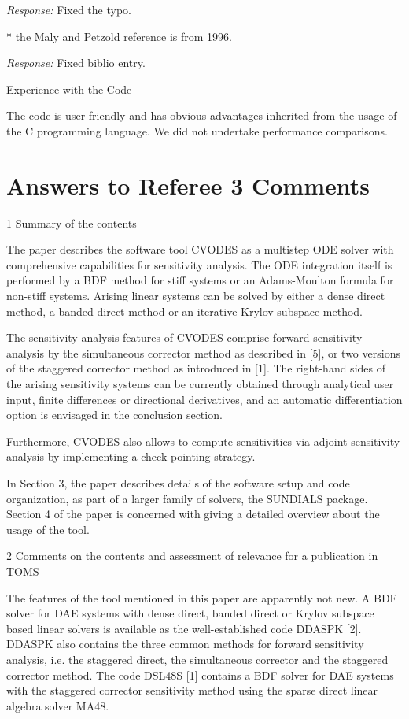 {\em Response:}
Fixed the typo.

* the Maly and Petzold reference is from 1996.

{\em Response:} Fixed biblio entry.

Experience with the Code

The code is user friendly and has obvious advantages inherited from
the usage of the C programming language. We did not undertake
performance comparisons.


\newpage
\section{Answers to Referee 3 Comments}

1 Summary of the contents

The paper describes the software tool CVODES as a multistep ODE solver
with comprehensive capabilities for sensitivity analysis. The ODE
integration itself is performed by a BDF method for stiff systems or
an Adams-Moulton formula for non-stiff systems. Arising linear systems
can be solved by either a dense direct method, a banded direct method
or an iterative Krylov subspace method.

The sensitivity analysis features of CVODES comprise forward
sensitivity analysis by the simultaneous corrector method as described
in [5], or two versions of the staggered corrector method as
introduced in [1]. The right-hand sides of the arising sensitivity
systems can be currently obtained through analytical user input,
finite differences or directional derivatives, and an automatic
differentiation option is envisaged in the conclusion section.

Furthermore, CVODES also allows to compute sensitivities via adjoint
sensitivity analysis by implementing a check-pointing strategy.

In Section 3, the paper describes details of the software setup and
code organization, as part of a larger family of solvers, the SUNDIALS
package.  Section 4 of the paper is concerned with giving a detailed
overview about the usage of the tool.

2 Comments on the contents and assessment of relevance for a
publication in TOMS

The features of the tool mentioned in this paper are apparently not
new. A BDF solver for DAE systems with dense direct, banded direct or
Krylov subspace based linear solvers is available as the
well-established code DDASPK [2]. DDASPK also contains the three
common methods for forward sensitivity analysis, i.e. the staggered
direct, the simultaneous corrector and the staggered corrector
method. The code DSL48S [1] contains a BDF solver for DAE systems with
the staggered corrector sensitivity method using the sparse direct
linear algebra solver MA48.

